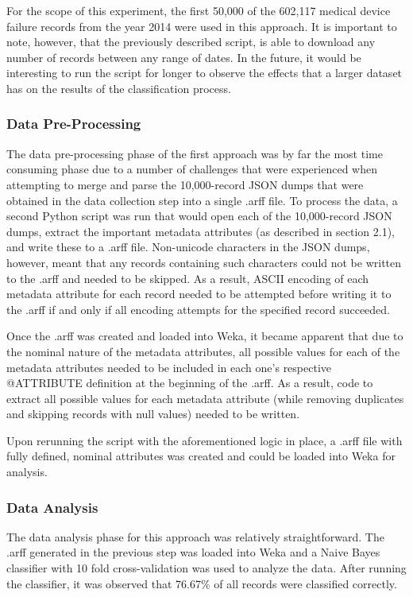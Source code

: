 \documentclass[11pt, notitlepage,abstracton,oneside]{article}   	%
\begin{document}
For the scope of this experiment, the first 50,000 of the 602,117 medical device failure records from the year 2014 were used in this approach. It is important to note, however, that the previously described script, is able to download any number of records between any range of dates. In the future, it would be interesting to run the script for longer to observe the effects that a larger dataset has on the results of the classification process.

\subsubsection{Data Pre-Processing}
The data pre-processing phase of the first approach was by far the most time consuming phase due to a number of challenges that were experienced when attempting to merge and parse the 10,000-record JSON dumps that were obtained in the data collection step into a single .arff file. To process the data, a second Python script was run that would open each of the 10,000-record JSON dumps, extract the important metadata attributes (as described in section 2.1), and write these to a .arff file. Non-unicode characters in the JSON dumps, however, meant that any records containing such characters could not be written to the .arff and needed to be skipped. As a result, ASCII encoding of each metadata attribute for each record needed to be attempted before writing it to the .arff if and only if all encoding attempts for the specified record succeeded.

Once the .arff was created and loaded into Weka, it became apparent that due to the nominal nature of the metadata attributes, all possible values for each of the metadata attributes needed to be included in each one's respective @ATTRIBUTE definition at the beginning of the .arff. As a result, code to extract all possible values for each metadata attribute (while removing duplicates and skipping records with null values)	 needed to be written. 

Upon rerunning the script with the aforementioned logic in place, a .arff file with fully defined, nominal attributes was created and could be loaded into Weka for analysis. 

\subsubsection{Data Analysis}
The data analysis phase for this approach was relatively straightforward. The .arff generated in the previous step was loaded into Weka and a Naive Bayes classifier with 10 fold cross-validation was used to analyze the data. After running the classifier, it was observed that 76.67\% of all records were classified correctly.
\end{document}
